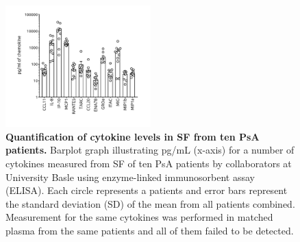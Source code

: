 \begin{figure}[htbp]
\centering
\includegraphics[width=0.5\textwidth]{./Appendix/pdfs/Chapter5/PSA_SF_elisa_cytokines_quantification}
\caption[Quantification of cytokine levels in SF from ten PsA patients.]{\textbf{Quantification of cytokine levels in SF from ten PsA patients.} Barplot graph illustrating pg/mL (x-axis) for a number of cytokines measured from SF of ten PsA patients by collaborators at University Basle using enzyme-linked immunosorbent assay (ELISA). Each circle represents a patients and error bars represent the standard deviation (SD) of the mean from all patients combined. Measurement for the same cytokines was performed in matched plasma from the same patients and all of them failed to be detected.}
\label{figure:ELISA_SF_PsA}
\end{figure}
